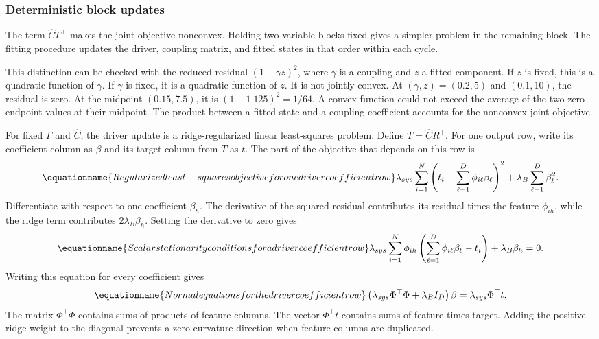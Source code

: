 \subsubsection{Deterministic block updates}

The term \(\widehat C\Gamma^\top\) makes the joint objective nonconvex. Holding two variable blocks fixed gives a simpler problem in the remaining block. The fitting procedure updates the driver, coupling matrix, and fitted states in that order within each cycle.

This distinction can be checked with the reduced residual \((1-\gamma z)^2\), where \(\gamma\) is a coupling and \(z\) a fitted component. If \(z\) is fixed, this is a quadratic function of \(\gamma\). If \(\gamma\) is fixed, it is a quadratic function of \(z\). It is not jointly convex. At \((\gamma,z)=(0.2,5)\) and \((0.1,10)\), the residual is zero. At the midpoint \((0.15,7.5)\), it is \((1-1.125)^2=1/64\). A convex function could not exceed the average of the two zero endpoint values at their midpoint. The product between a fitted state and a coupling coefficient accounts for the nonconvex joint objective.

For fixed \(\Gamma\) and \(\widehat C\), the driver update is a ridge-regularized linear least-squares problem. Define \(T=\widehat C R^\top\). For one output row, write its coefficient column as \(\beta\) and its target column from \(T\) as \(t\). The part of the objective that depends on this row is
\begin{equation}
\equationname{Regularized least-squares objective for one driver coefficient row}
\label{eq:icsor_ridge_row_objective}
\lambda_{sys}\sum_{i=1}^{N}
\left(t_i-\sum_{\ell=1}^{D}\phi_{i\ell}\beta_\ell\right)^2
+\lambda_B\sum_{\ell=1}^{D}\beta_\ell^2.
\end{equation}
Differentiate with respect to one coefficient \(\beta_h\). The derivative of the squared residual contributes its residual times the feature \(\phi_{ih}\), while the ridge term contributes \(2\lambda_B\beta_h\). Setting the derivative to zero gives
\begin{equation}
\equationname{Scalar stationarity conditions for a driver coefficient row}
\label{eq:icsor_ridge_scalar_normal}
\lambda_{sys}\sum_{i=1}^{N}\phi_{ih}
\left(\sum_{\ell=1}^{D}\phi_{i\ell}\beta_\ell-t_i\right)
+\lambda_B\beta_h=0.
\end{equation}
Writing this equation for every coefficient gives
\begin{equation}
\equationname{Normal equations for the driver coefficient row}
\label{eq:icsor_ridge_normal_equations}
\left(\lambda_{sys}\Phi^\top\Phi+\lambda_BI_D\right)\beta
=\lambda_{sys}\Phi^\top t.
\end{equation}
The matrix \(\Phi^\top\Phi\) contains sums of products of feature columns. The vector \(\Phi^\top t\) contains sums of feature times target. Adding the positive ridge weight to the diagonal prevents a zero-curvature direction when feature columns are duplicated.

